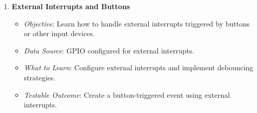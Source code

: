 \documentclass{article}
\begin{document}
\begin{enumerate}[label=\arabic*.]
    \item \textbf{External Interrupts and Buttons}
    \begin{itemize}
        \item \textit{Objective}: Learn how to handle external interrupts triggered by buttons or other input devices.
        \item \textit{Data Source}: GPIO configured for external interrupts.
        \item \textit{What to Learn}: Configure external interrupts and implement debouncing strategies.
        \item \textit{Testable Outcome}: Create a button-triggered event using external interrupts.
    \end{itemize}
\end{enumerate}
\end{document}
